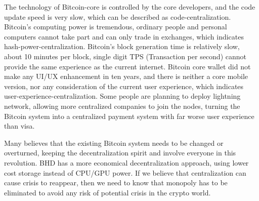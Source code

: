 \begin{flushleft}
    The technology of Bitcoin-core is controlled by the core developers, and the code update speed is very slow, which can be described as code-centralization. Bitcoin's computing power is tremendous, ordinary people and personal computers cannot take part and can only trade in exchanges, which indicates hash-power-centralization. Bitcoin's block generation time is relatively slow, about 10 minutes per block, single digit TPS (Transaction per second) cannot provide the same experience as the current internet. Bitcoin core wallet did not make any UI/UX enhancement in ten years, and there is neither a core mobile version, nor any consideration of the current user experience, which indicates user-experience-centralization. Some people are planning to deploy lightning network, allowing more centralized companies to join the nodes, turning the Bitcoin system into a centralized payment system with far worse user experience than visa.
\end{flushleft}
\begin{flushleft}
    Many believes that the existing Bitcoin system needs to be changed or overturned, keeping the decentralization spirit and involve everyone in this revolution. BHD has a more economical decentralization approach, using lower cost storage instead of CPU/GPU power. If we believe that centralization can cause crisis to reappear, then we need to know that monopoly has to be eliminated to avoid any risk of potential crisis in the crypto world.
\end{flushleft}
